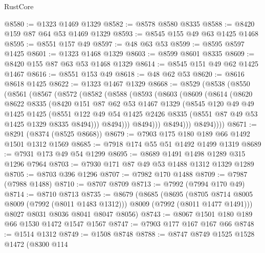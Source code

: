 \begin{lexlean}{RustCore}
\begin{coremodule}
@8580 := @1323 @1469 @1329
@8582 := @8578 @8580 @8335
@8588 := @8420 @159 @87 @64 @53 @1469 @1329
@8593 := @8545 @155 @49 @63 @1425 @1468
@8595 := @8551 @157 @49
@8597 := @48 @63 @53
@8599 := @8595 @8597 @1425
@8601 := @1323 @1468 @1329
@8603 := @8599 @8601 @8335
@8609 := @8420 @155 @87 @63 @53 @1468 @1329
@8614 := @8545 @151 @49 @62 @1425 @1467
@8616 := @8551 @153 @49
@8618 := @48 @62 @53
@8620 := @8616 @8618 @1425
@8622 := @1323 @1467 @1329
@8668 := @8529
    (@8538
      (@8550
        (@8561
          (@8567
            (@8572
              (@8582
                (@8588
                  (@8593
                    (@8603
                      (@8609
                        (@8614
                          (@8620
                            @8622
                            @8335
                            (@8420
                              @151
                              @87
                              @62
                              @53
                              @1467
                              @1329
                              (@8545
                                @120
                                @49
                                @49
                                @1425
                                @1425
                                (@8551
                                  @122
                                  @49
                                  @54
                                  @1425
                                  @2426
                                  @8335
                                  (@8551 @87 @49 @53 @1425 @1329 @8335 @8494)))
                              @8494)))
                        @8494)))
                  @8494)))
            @8494))))
@8671 := @8291 (@8374 (@8525 @8668))
@8679 := @7903 @175 @180 @189 @66 @1492 @1501 @1312 @1569
@8685 := @7918 @174 @55 @51 @1492 @1499 @1319
@8689 := @7931 @173 @49 @54 @1299
@8695 := @8689 @1491 @1498 @1289 @315 @1296 @7964
@8703 := @7930 @171 @87 @49 @53 @1488 @1312 @1329 @1289
@8705 := @8703 @396 @1296
@8707 := @7982 @170 @1488
@8709 := @7987 (@7988 @1488)
@8710 := @8707 @8709
@8713 := @7992 (@7994 @170 @49)
@8714 := @8710 @8713
@8735 := @8679
    (@8685
      (@8695
        (@8705 @8714 @8005 @8009 (@7992 (@8011 @1483 @1312)))
        @8009
        (@7992 (@8011 @1477 @1491)))
      @8027
      @8031
      @8036
      @8041
      @8047
      @8056)
@8743 := @8067 @1501 @180 @189 @66 @1530 @1472 @1547 @1567
@8747 := @7903 @177 @167 @167 @66
@8748 := @1514 @1312
@8749 := @1508 @8748
@8788 := @8747
    @8749
    @1525
    @1528
    @1472
    (@8300
      @114

\end{coremodule}
\end{lexlean}
